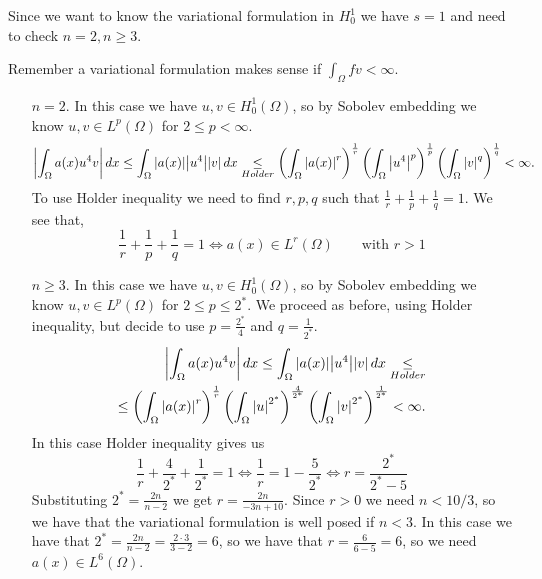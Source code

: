     Since we want to know the variational formulation in \(H^1_0\) we have \(s = 1\) and need to check \(n = 2, n \geq 3\). 
    
    Remember a variational formulation makes sense if \(\int_\Omega fv < \infty\).
    \begin{itemize}
        \item[\(n = 2\).] In this case we have \(u, v \in H^1_0(\Omega)\), so by Sobolev embedding we know \(u, v \in L^p(\Omega)\) for \(2 \leq p < \infty\). 
        \[
            \abs{\int_\Omega a(x) u^4 v}  \, dx \leq \int_\Omega \abs{a(x)} \abs{u^4} \abs{v} \, dx \underset{Holder}{\leq} \left(\int_\Omega \abs{a(x)}^r\right)^{\frac{1}{r}} \left(\int_\Omega \abs{u^4}^p \right)^{\frac{1}{p}} \left(\int_\Omega \abs{v}^q \right)^{\frac{1}{q}} < \infty.
        \]
        To use Holder inequality we need to find \(r, p, q\) such that \(\frac{1}{r} + \frac{1}{p} + \frac{1}{q} = 1\). We see that, 
        \[
            \frac{1}{r} + \frac{1}{p} + \frac{1}{q} = 1 \iff a(x) \in L^r(\Omega) \qquad \text{with } r > 1
        \]
        \item[\(n \geq 3\).] In this case we have \(u, v \in H^1_0(\Omega)\), so by Sobolev embedding we know \(u, v \in L^p(\Omega)\) for \(2 \leq p \leq 2^*\).
        We proceed as before, using Holder inequality, but decide to use \(p = \frac{2^*}{4}\) and \(q = \frac{1}{2^*}.\)
        \[
            \begin{split}
                \abs{\int_\Omega a(x) u^4 v}  \, dx \leq \int_\Omega \abs{a(x)} \abs{u^4} \abs{v} \, dx \underset{{Holder}}{\leq} \\
                \leq \left(\int_\Omega \abs{a(x)}^r\right)^{\frac{1}{r}} \left(\int_\Omega \abs{u}^{2^*} \right)^{\frac{4}{2^*}} \left(\int_\Omega \abs{v}^{2^*} \right)^{\frac{1}{2^*}} < \infty.
            \end{split}
        \]
        In this case Holder inequality gives us 
        \[
            \frac{1}{r} + \frac{4}{2^*} + \frac{1}{2^*} = 1 \iff \frac{1}{r} = 1 - \frac{5}{2^*} \iff r = \frac{2^*}{2^* - 5}
        \]
        Substituting \(2^* = \frac{2n}{n - 2}\) we get \(r = \frac{2n}{-3n + 10}\). Since \(r > 0\) we need \(n < 10/3\), so we have that the variational formulation is well posed if \(n < 3\).
        In this case we have that \(2^* = \frac{2n}{n - 2} = \frac{2 \cdot 3}{3 - 2} = 6\), so we have that \(r = \frac{6}{6 - 5} = 6\), so we need \(a(x) \in L^6(\Omega)\).
    \end{itemize}
    \newpage
    
